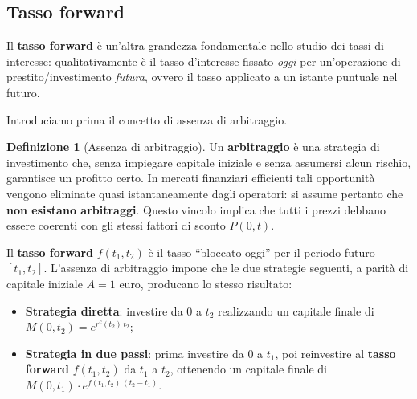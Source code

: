 \documentclass[11pt,a4paper]{article}
\theoremstyle{plain}
\theoremstyle{definition}
\newtheorem{definizione}[teorema]{Definizione}
\theoremstyle{remark}
\begin{document}


\subsection{Tasso forward}

Il \textbf{tasso forward} \`e un'altra grandezza fondamentale nello studio dei tassi di
interesse: qualitativamente \`e il tasso d'interesse fissato \emph{oggi} per un'operazione di
prestito/investimento \emph{futura}, ovvero il tasso applicato a un istante
puntuale nel futuro. 

Introduciamo prima il concetto di assenza di arbitraggio.
\begin{definizione}[Assenza di arbitraggio]
\label{def:noarb}
Un \textbf{arbitraggio} \`e una strategia di investimento che, senza impiegare capitale
iniziale e senza assumersi alcun rischio, garantisce un profitto certo. In mercati
finanziari efficienti tali opportunit\`a vengono eliminate quasi istantaneamente dagli
operatori: si assume pertanto che \textbf{non esistano arbitraggi}. Questo vincolo implica
che tutti i prezzi debbano essere coerenti con gli stessi fattori di sconto $P(0,t)$.
\end{definizione}

Il \textbf{tasso forward} $f(t_1, t_2)$ \`e il tasso ``bloccato oggi'' per il periodo
futuro $[t_1, t_2]$. L'assenza di arbitraggio impone che le due strategie seguenti, a parit\`a
di capitale iniziale $A=1$ euro, producano lo stesso risultato:
\begin{itemize}
  \item \textbf{Strategia diretta}: investire da $0$ a $t_2$ realizzando un capitale finale di $M(0,t_2) = e^{r^c(t_2)\,t_2}$;
  \item \textbf{Strategia in due passi}: prima investire da $0$ a $t_1$, poi reinvestire al
        \textbf{tasso forward} $f(t_1,t_2)$ da $t_1$ a $t_2$, ottenendo un capitale finale di
        $M(0,t_1)\cdot e^{f(t_1,t_2)\,(t_2-t_1)}$.
\end{itemize}
\end{document}
